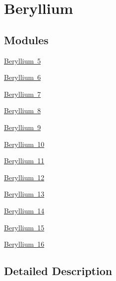 \hypertarget{group___isotope_const-_beryllium}{}\section{Beryllium}
\label{group___isotope_const-_beryllium}
\subsection*{Modules}
\begin{DoxyCompactItemize}
\item 
\mbox{\hyperlink{group___isotope_const-_beryllium-_be5}{Beryllium 5}}
\item 
\mbox{\hyperlink{group___isotope_const-_beryllium-_be6}{Beryllium 6}}
\item 
\mbox{\hyperlink{group___isotope_const-_beryllium-_be7}{Beryllium 7}}
\item 
\mbox{\hyperlink{group___isotope_const-_beryllium-_be8}{Beryllium 8}}
\item 
\mbox{\hyperlink{group___isotope_const-_beryllium-_be9}{Beryllium 9}}
\item 
\mbox{\hyperlink{group___isotope_const-_beryllium-_be10}{Beryllium 10}}
\item 
\mbox{\hyperlink{group___isotope_const-_beryllium-_be11}{Beryllium 11}}
\item 
\mbox{\hyperlink{group___isotope_const-_beryllium-_be12}{Beryllium 12}}
\item 
\mbox{\hyperlink{group___isotope_const-_beryllium-_be13}{Beryllium 13}}
\item 
\mbox{\hyperlink{group___isotope_const-_beryllium-_be14}{Beryllium 14}}
\item 
\mbox{\hyperlink{group___isotope_const-_beryllium-_be15}{Beryllium 15}}
\item 
\mbox{\hyperlink{group___isotope_const-_beryllium-_be16}{Beryllium 16}}
\end{DoxyCompactItemize}


\subsection{Detailed Description}
